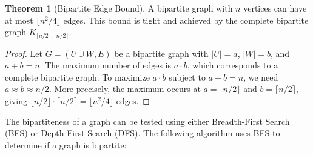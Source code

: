 \documentclass{article}
\theoremstyle{definition}
\newtheorem{theorem}{Theorem}
\begin{document}
\begin{theorem}[Bipartite Edge Bound]
A bipartite graph with $n$ vertices can have at most $\lfloor n^2/4 \rfloor$ edges. This bound is tight and achieved by the complete bipartite graph $K_{\lfloor n/2 \rfloor, \lceil n/2 \rceil}$.
\end{theorem}

\begin{proof}
Let $G = (U \cup W, E)$ be a bipartite graph with $|U| = a$, $|W| = b$, and $a + b = n$. The maximum number of edges is $a \cdot b$, which corresponds to a complete bipartite graph. To maximize $a \cdot b$ subject to $a + b = n$, we need $a \approx b \approx n/2$. More precisely, the maximum occurs at $a = \lfloor n/2 \rfloor$ and $b = \lceil n/2 \rceil$, giving $\lfloor n/2 \rfloor \cdot \lceil n/2 \rceil = \lfloor n^2/4 \rfloor$ edges.
\end{proof}

The bipartiteness of a graph can be tested using either Breadth-First Search (BFS) or Depth-First Search (DFS). The following algorithm uses BFS to determine if a graph is bipartite:
\end{document}
